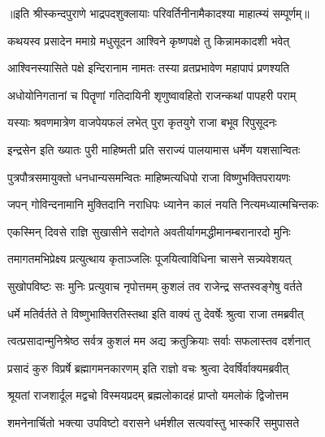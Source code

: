 ॥इति श्रीस्कन्दपुराणे भाद्रपदशुक्लायाः परिवर्तिनीनामैकादश्या माहात्म्यं सम्पूर्णम्॥



\twolineshloka
{कथयस्व प्रसादेन ममाग्रे मधुसूदन}
{आश्विने कृष्णपक्षे तु किन्नामकादशी भवेत्} %


\twolineshloka
{आश्विनस्यासिते पक्षे इन्दिरानाम नामतः}
{तस्या व्रतप्रभावेण महापापं प्रणश्यति} %

\twolineshloka
{अधोयोनिगतानां च पितॄणां गतिदायिनी}
{शृणुष्वावहितो राजन्कथां पापहरी पराम्} %

\twolineshloka
{यस्याः श्रवणमात्रेण वाजपेयफलं लभेत्}
{पुरा कृतयुगे राजा बभूव रिपुसूदनः} %

\twolineshloka
{इन्द्रसेन इति ख्यातः पुरी माहिष्मती प्रति}
{सराज्यं पालयामास धर्मेण यशसान्वितः} %

\twolineshloka
{पुत्रपौत्रसमायुक्तो धनधान्यसमन्वितः}
{माहिष्मत्यधिपो राजा विष्णुभक्तिपरायणः} %

\twolineshloka
{जपन् गोविन्दनामानि मुक्तिदानि नराधिपः}
{ध्यानेन कालं नयति नित्यमध्यात्मचिन्तकः} %

\twolineshloka
{एकस्मिन् दिवसे राज्ञि सुखासीने सदोगते}
{अवतीर्यागमद्धीमानम्बरानारदो मुनिः} %

\twolineshloka
{तमागतमभिप्रेक्ष्य प्रत्युत्थाय कृताञ्जलिः}
{पूजयित्वाविधिना चासने सन्न्यवेशयत्} %

\twolineshloka
{सुखोपविष्टः सः मुनिः प्रत्युवाच नृपोत्तमम्}
{कुशलं तव राजेन्द्र सप्तस्वङ्गेषु वर्तते} %

\twolineshloka
{धर्मे मतिर्वर्तते ते विष्णुभाक्तिरतिस्तथा}
{इति वाक्यं तु देवर्षेः श्रुत्वा राजा तमब्रवीत्} %


\twolineshloka
{त्वत्प्रसादान्मुनिश्रेष्ठ सर्वत्र कुशलं मम}
{अद्य क्रतुक्रियाः सर्वाः सफलास्तव दर्शनात्} %

\twolineshloka
{प्रसादं कुरु विप्रर्षे ब्रह्मागमनकारणम्}
{इति राज्ञो वचः श्रुत्वा देवर्षिर्वाक्यमब्रवीत्} %


\twolineshloka
{श्रूयतां राजशार्दूल मद्वचो विस्मयप्रदम्}
{ब्रह्मलोकादहं प्राप्तो यमलोकं द्विजोत्तम} %

\twolineshloka
{शमनेनार्चितो भक्त्या उपविष्टो वरासने}
{धर्मशील सत्यवांस्तु भास्करिं समुपासते} %

